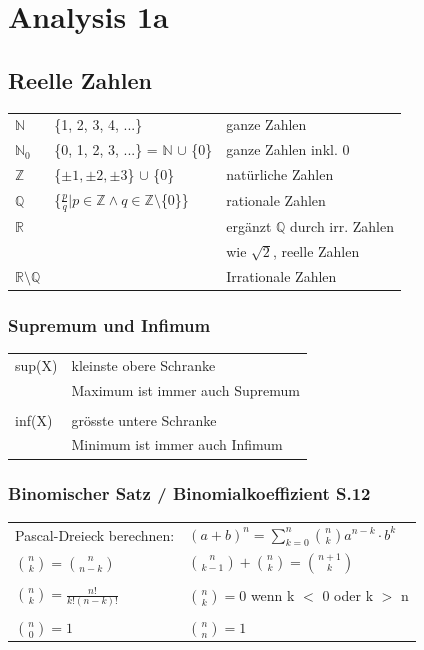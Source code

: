 \section{Analysis 1a}

    \subsection{Reelle Zahlen}
	
		\begin{tabular}{l l l}
			$\mathbb{N}$  & \{1, 2, 3, 4, ...\} & ganze Zahlen \\
			$\mathbb{N}_0$ & \{0, 1, 2, 3, ...\} = $\mathbb{N}$ $\cup$ \{0\} & ganze Zahlen inkl. 0 \\
			$\mathbb{Z}$ & \{$\pm1, \pm2, \pm3 $\} $\cup$ \{0\} & natürliche Zahlen \\
			$\mathbb{Q}$ & \{$ \frac{p}{q} | p \in \mathbb{Z} \wedge q \in \mathbb{Z} \setminus $\{0\}\} & rationale Zahlen \\
			$\mathbb{R}$ & & ergänzt $\mathbb{Q}$ durch irr. Zahlen \\
			             & & wie $\sqrt{2}$, reelle Zahlen \\
			$\mathbb{R} \setminus \mathbb{Q}$ & & Irrationale Zahlen \\
		\end{tabular}

		\subsubsection{Supremum und Infimum}
			\begin{tabular}{ll} 
				sup(X) & kleinste obere Schranke  \\
				       & Maximum ist immer auch Supremum \\
				\\
				inf(X) &  grösste untere Schranke \\ 
				       & Minimum ist immer auch Infimum \\
			\end{tabular}			
				
		\subsubsection{Binomischer Satz / Binomialkoeffizient S.12}	
			\begin{tabular}{ll} 
				Pascal-Dreieck berechnen:  & $\left(a+b\right)^n = \sum\limits _{k=0}^n \binom{n}{k}a^{n-k}\cdot b^k$ \\
				$\binom{n}{k}=\binom{n}{n-k}$ & $\binom{n}{k-1}+\binom{n}{k}=\binom{n+1}{k}$ \\
				\\
				$\binom{n}{k}=\frac{n!}{k!\left(n-k\right)!}$ & $\binom{n}{k} = 0$ wenn k $<$ 0 oder k $>$ n \\ 
				\\
				$\binom{n}{0}=1$ &  $\binom{n}{n}=1$ \\ 	 		
			\end{tabular}				 
				 
